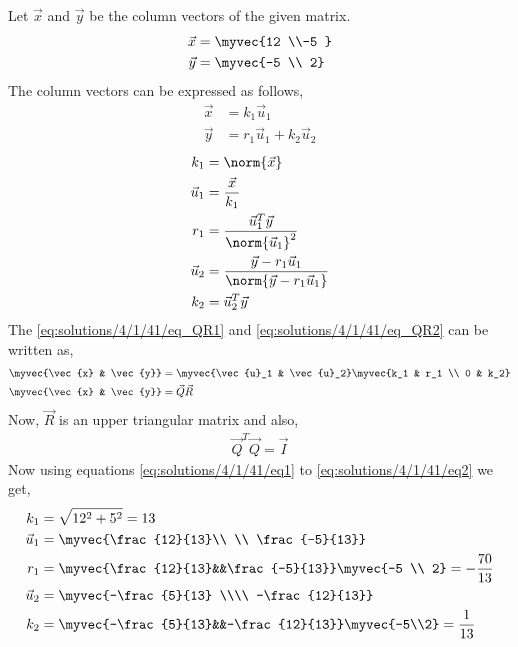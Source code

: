 
Let $\vec{x}$ and $\vec{y}$ be the column vectors of the given matrix.
\begin{align}
    \vec{x} &= \myvec{12 \\-5 }\\
    \vec{y} &= \myvec{-5 \\ 2}
\end{align}
The column vectors can be expressed as follows,
\begin{align}
    \vec{x} &= k_1\vec{u}_1\label{eq:solutions/4/1/41/eq_QR1}\\
    \vec{y} &= r_1\vec{u}_1+k_2\vec{u}_2\label{eq:solutions/4/1/41/eq_QR2}
\end{align}
\begin{align}
    k_1 &= \norm{\vec{x}}\label{eq:solutions/4/1/41/eq1}\\
    \vec{u}_1 &= \frac{\vec{x}}{k_1}\\
    r_1 &= \frac{\vec{u}_1^T\vec{y}}{\norm{\vec{u}_1}^2}\\
    \vec{u}_2 &= \frac{\vec{y} - r_1 \vec{u}_1}{\norm{\vec{y} - r_1 \vec{u}_1}}\\
    k_2 &= {\vec{u}_2^T\vec{y}}\label{eq:solutions/4/1/41/eq2}
\end{align}
The \eqref{eq:solutions/4/1/41/eq_QR1} and \eqref{eq:solutions/4/1/41/eq_QR2} can be written as, 
\begin{align}
\myvec{\vec{x} & \vec{y}} &= \myvec{\vec{u}_1 & \vec{u}_2}\myvec{k_1 & r_1 \\ 0 & k_2}\label{eq:solutions/4/1/41/QRMain}\\
\myvec{\vec{x} & \vec{y}} &= \vec{Q}\vec{R}
\end{align}
Now, $\vec{R}$ is an upper triangular matrix and also,
\begin{align}
\vec{Q}^T\vec{Q}=\vec{I}
\end{align}
Now using equations \eqref{eq:solutions/4/1/41/eq1} to \eqref{eq:solutions/4/1/41/eq2} we get, 
\begin{align}
    k_1 &= \sqrt{12^2+5^2} = 13\label{eq:solutions/4/1/41/eqval1}\\ 
    \vec{u}_1 &= \myvec{\frac{12}{13}\\ \\ \frac{-5}{13}} \\
    r_1 &= \myvec{\frac{12}{13}&&\frac{-5}{13}}\myvec{-5 \\ 2} = -\frac{70}{13}\\ 
    \vec{u}_2 &= \myvec{-\frac{5}{13} \\\\ -\frac{12}{13}} \\
    k_2 &= \myvec{-\frac{5}{13}&&-\frac{12}{13}}\myvec{-5\\2} = \frac{1}{13}\label{eq:solutions/4/1/41/eqval2} 
\end{align}
